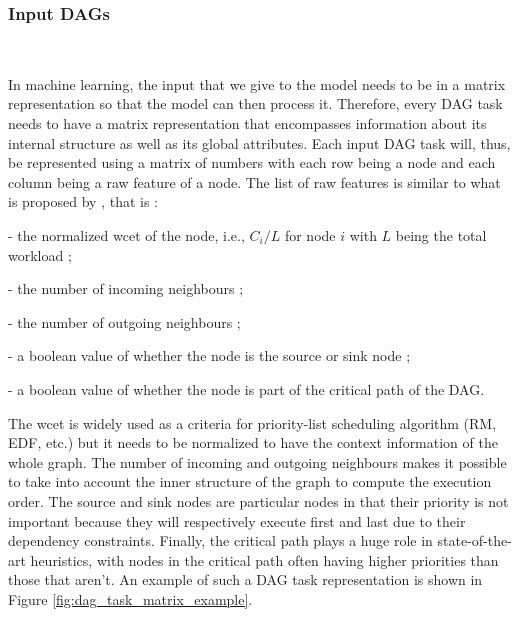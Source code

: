 \subsubsection{Input DAGs}
~

In machine learning, the input that we give to the model
needs to be in a matrix representation so that the model can 
then process it. Therefore, every DAG task needs to have
a matrix representation that encompasses information 
about its internal structure as well as its global attributes.  
Each input DAG task will, thus, be represented using 
a matrix of numbers with each row being a node
and each column being a raw feature of a node.
The list of raw features is similar to what is proposed by \citet{Lee2021GlobalDagSchedDRL},
that is :
\begin{list}{}{}
    \item - the normalized wcet of the node, i.e., $C_i / L$ for node $i$ with $L$ being the total workload ;
    \item - the number of incoming neighbours ;
    \item - the number of outgoing neighbours ;
    \item - a boolean value of whether the node is the source or sink node ;
    \item - a boolean value of whether the node is part of the critical path of the DAG.
\end{list}

The wcet is widely used as a criteria for priority-list scheduling algorithm (RM, EDF\cite{buttazzo2005RMvsEDF}, etc.)
but it needs to be normalized to have the context information of the whole graph.
The number of incoming and outgoing neighbours makes it possible 
to take into account the inner structure of the graph to compute the execution order.
The source and sink nodes are particular nodes in that their priority
is not important because they will respectively execute first and last due to their dependency constraints.
Finally, the critical path plays a huge role in state-of-the-art heuristics\cite{He2019DagIntra}\cite{zhao2020DAGsched},
with nodes in the critical path often having higher priorities than those
that aren't.
An example of such a DAG task representation is shown in Figure \ref{fig:dag_task_matrix_example}.

